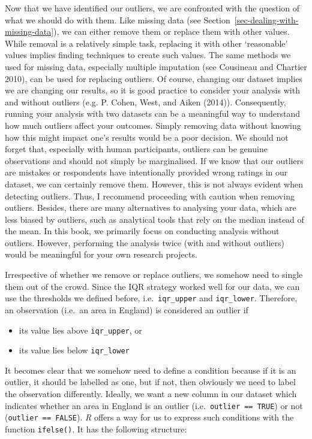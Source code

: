 \documentclass[
  letterpaper,
  DIV=11,
  numbers=noendperiod]{scrreprt}
\begin{document}
Now that we have identified our outliers, we are confronted with the
question of what we should do with them. Like missing data (see
Section~\ref{sec-dealing-with-missing-data}), we can either remove them
or replace them with other values. While removal is a relatively simple
task, replacing it with other `reasonable' values implies finding
techniques to create such values. The same methods we used for missing
data, especially multiple imputation (see Cousineau and Chartier 2010),
can be used for replacing outliers. Of course, changing our dataset
implies we are changing our results, so it is good practice to consider
your analysis with and without outliers (e.g. P. Cohen, West, and Aiken
(2014)). Consequently, running your analysis with two datasets can be a
meaningful way to understand how much outliers affect your outcomes.
Simply removing data without knowing how this might impact one's results
would be a poor decision. We should not forget that, especially with
human participants, outliers can be genuine observations and should not
simply be marginalised. If we know that our outliers are mistakes or
respondents have intentionally provided wrong ratings in our dataset, we
can certainly remove them. However, this is not always evident when
detecting outliers. Thus, I recommend proceeding with caution when
removing outliers. Besides, there are many alternatives to analysing
your data, which are less biased by outliers, such as analytical tools
that rely on the median instead of the mean. In this book, we primarily
focus on conducting analysis without outliers. However, performing the
analysis twice (with and without outliers) would be meaningful for your
own research projects.

Irrespective of whether we remove or replace outliers, we somehow need
to single them out of the crowd. Since the IQR strategy worked well for
our data, we can use the thresholds we defined before,
i.e.~\texttt{iqr\_upper} and \texttt{iqr\_lower}. Therefore, an
observation (i.e.~an area in England) is considered an outlier if

\begin{itemize}
\item
  its value lies above \texttt{iqr\_upper}, or
\item
  its value lies below \texttt{iqr\_lower}
\end{itemize}

It becomes clear that we somehow need to define a condition because if
it is an outlier, it should be labelled as one, but if not, then
obviously we need to label the observation differently. Ideally, we want
a new column in our dataset which indicates whether an area in England
is an outlier (i.e.~\texttt{outlier\ ==\ TRUE}) or not
(\texttt{outlier\ ==\ FALSE}). \emph{R} offers a way for us to express
such conditions with the function \texttt{ifelse()}. It has the
following structure:
\end{document}
